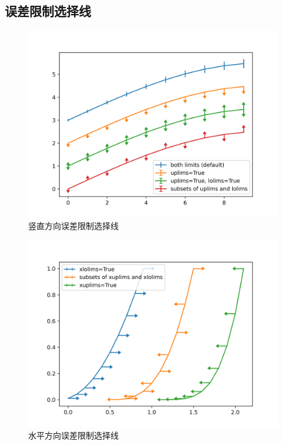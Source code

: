 \documentclass[openany]{progbookcn}
\begin{document}
\subsection{误差限制选择线}

\begin{figure}[H]
\centering
\includegraphics[width=0.6 \textwidth]{figs/chapter24/lines/UpLowErrorBar}
\caption{竖直方向误差限制选择线}
\end{figure}

\begin{figure}[H]
\centering
\includegraphics[width=0.6 \textwidth]{figs/chapter24/lines/XYErrorBar}
\caption{水平方向误差限制选择线}
\end{figure}
\end{document}
